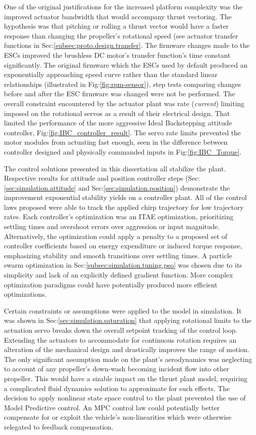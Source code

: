 \par
One of the original justifications for the increased platform complexity was the improved actuator bandwidth that would accompany thrust vectoring. The hypothesis was that pitching or rolling a thrust vector would have a faster response than changing the propeller's rotational speed (see actuator transfer functions in Sec:\ref{subsec:proto.design.transfer}. The firmware changes made to the ESCs improved the brushless DC motor's transfer function's time constant significantly. The original firmware which the ESCs used by default produced an exponentially approaching speed curve rather than the standard linear relationships (illustrated in Fig:\ref{fig:rpm-sensor}), step tests comparing changes before and after the ESC firmware was changed were not be performed. The overall constraint encountered by the actuator plant was rate (\emph{current}) limiting imposed on the rotational servos as a result of their electrical design. That limited the performance of the more aggressive Ideal Backstepping attitude controller, Fig:\ref{fig:IBC_controller_result}. The servo rate limits prevented the motor modules from actuating fast enough, seen in the difference between controller designed and physically commanded inputs in Fig:\ref{fig:IBC_Torque}.
\par
The control solutions presented in this dissertation all stabilize the plant. Respective results for attitude and position controller steps (Sec:\ref{sec:simulation.attitude} and Sec:\ref{sec:simulation.position}) demonstrate the improvement exponential stability yields on a controller plant. All of the control laws proposed were able to track the applied chirp trajectory for low trajectory rates. Each controller's optimization was an ITAE optimization, prioritizing settling times and overshoot errors over aggression or input magnitude. Alternatively, the optimization could apply a penalty to a proposed set of controller coefficients based on energy expenditure or induced torque response, emphasizing stability and smooth transitions over settling times. A particle swarm optimization in Sec:\ref{subsec:simulation.tuning.pso} was chosen due to its simplicity and lack of an explicitly defined gradient function. More complex optimization paradigms could have potentially produced more efficient optimizations.
\par
Certain constraints or assumptions were applied to the model in simulation. It was shown in Sec:\ref{sec:simulation.saturation} that applying rotational limits to the actuation servo breaks down the overall setpoint tracking of the control loop. Extending the actuators to accommodate for continuous rotation requires an alteration of the mechanical design and drastically improves the range of motion. The only significant assumption made on the plant's aerodynamics was neglecting to account of any propeller's down-wash becoming incident flow into other propeller. This would have a sizable impact on the thrust plant model, requiring a complicated fluid dynamics solution to approximate for such effects. The decision to apply nonlinear state space control to the plant prevented the use of Model Predictive control. An MPC control law could potentially better compensate for or exploit the vehicle's non-linearities which were otherwise relegated to feedback compensation.

